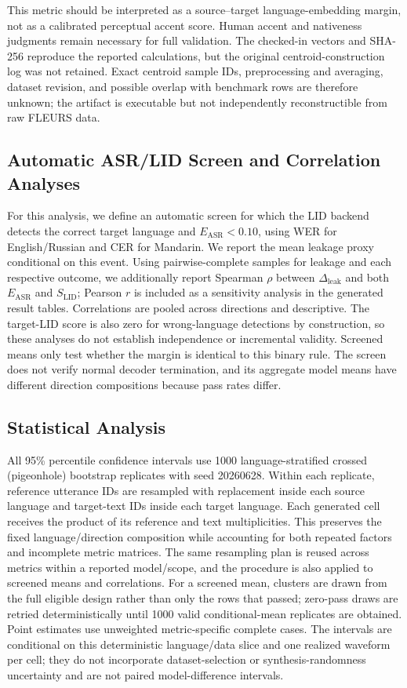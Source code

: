 \documentclass[11pt]{article}
\newcommand{\leakdelta}{\Delta_{\mathrm{leak}}}
\begin{document}
This metric should be interpreted as a source--target language-embedding margin, not as a calibrated perceptual accent score. Human accent and nativeness judgments remain necessary for full validation. The checked-in vectors and SHA-256 reproduce the reported calculations, but the original centroid-construction log was not retained. Exact centroid sample IDs, preprocessing and averaging, dataset revision, and possible overlap with benchmark rows are therefore unknown; the artifact is executable but not independently reconstructible from raw FLEURS data.

\subsection{Automatic ASR/LID Screen and Correlation Analyses}

For this analysis, we define an automatic screen for which the LID backend detects the correct target language and $E_{\mathrm{ASR}}<0.10$, using WER for English/Russian and CER for Mandarin. We report the mean leakage proxy conditional on this event. Using pairwise-complete samples for leakage and each respective outcome, we additionally report Spearman $\rho$ between $\leakdelta$ and both $E_{\mathrm{ASR}}$ and $S_{\mathrm{LID}}$; Pearson $r$ is included as a sensitivity analysis in the generated result tables. Correlations are pooled across directions and descriptive. The target-LID score is also zero for wrong-language detections by construction, so these analyses do not establish independence or incremental validity. Screened means only test whether the margin is identical to this binary rule. The screen does not verify normal decoder termination, and its aggregate model means have different direction compositions because pass rates differ.

\subsection{Statistical Analysis}

All 95\% percentile confidence intervals use 1000 language-stratified crossed (pigeonhole) bootstrap replicates with seed 20260628. Within each replicate, reference utterance IDs are resampled with replacement inside each source language and target-text IDs inside each target language. Each generated cell receives the product of its reference and text multiplicities. This preserves the fixed language/direction composition while accounting for both repeated factors and incomplete metric matrices. The same resampling plan is reused across metrics within a reported model/scope, and the procedure is also applied to screened means and correlations. For a screened mean, clusters are drawn from the full eligible design rather than only the rows that passed; zero-pass draws are retried deterministically until 1000 valid conditional-mean replicates are obtained. Point estimates use unweighted metric-specific complete cases. The intervals are conditional on this deterministic language/data slice and one realized waveform per cell; they do not incorporate dataset-selection or synthesis-randomness uncertainty and are not paired model-difference intervals.
\end{document}
